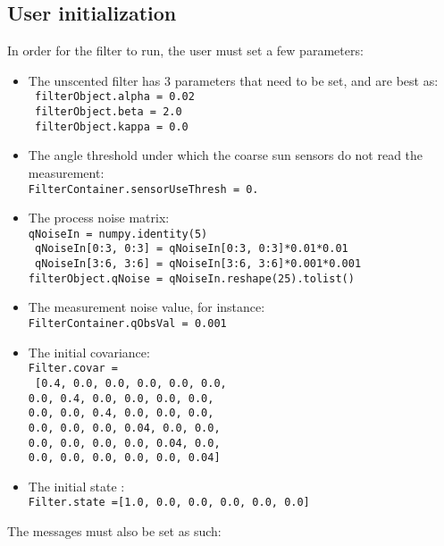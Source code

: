 \documentclass[]{BasiliskReportMemo}
\begin{document}
\subsection{User initialization}

In order for the filter to run, the user must set a few parameters:

\begin{itemize}
\item The unscented filter has 3 parameters that need to be set, and are best as: \\
      \texttt{ filterObject.alpha = 0.02} \\
      \texttt{ filterObject.beta = 2.0} \\
      \texttt{ filterObject.kappa = 0.0} 
\item The angle threshold under which the coarse sun sensors do not read the measurement: \\ 
\texttt{FilterContainer.sensorUseThresh = 0.}
\item The process noise matrix: \\
   \texttt{qNoiseIn = numpy.identity(5)} \\
   \texttt{ qNoiseIn[0:3, 0:3] = qNoiseIn[0:3, 0:3]*0.01*0.01} \\
   \texttt{ qNoiseIn[3:6, 3:6] = qNoiseIn[3:6, 3:6]*0.001*0.001} \\
    \texttt{filterObject.qNoise = qNoiseIn.reshape(25).tolist()}
\item The measurement noise value, for instance: \\
 \texttt{FilterContainer.qObsVal = 0.001}
\item The initial covariance: \\
 \texttt{Filter.covar =} \\
  \texttt{ [0.4, 0.0, 0.0, 0.0, 0.0, 0.0, \\
                          0.0, 0.4, 0.0, 0.0, 0.0, 0.0, \\
                          0.0, 0.0, 0.4, 0.0, 0.0, 0.0, \\
                          0.0, 0.0, 0.0, 0.04, 0.0, 0.0, \\
                          0.0, 0.0, 0.0, 0.0, 0.04, 0.0, \\
                          0.0, 0.0, 0.0, 0.0, 0.0, 0.04]}
\item The initial state :\\
 \texttt{Filter.state =[1.0, 0.0, 0.0, 0.0, 0.0, 0.0]}
\end{itemize}
The messages must also be set as such:
\end{document}
